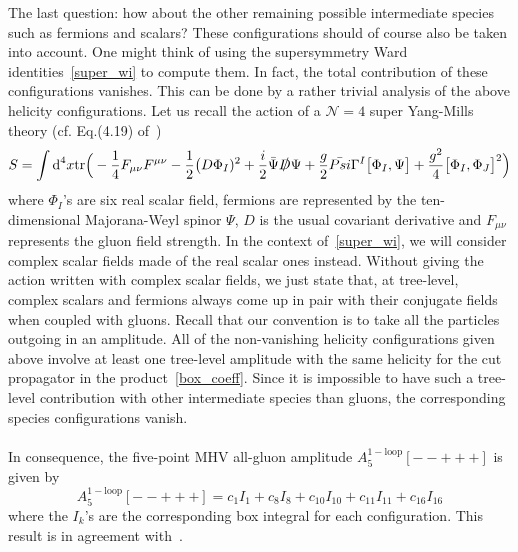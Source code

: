 The last question: how about the other remaining possible intermediate species such as fermions and scalars?
These configurations should of course also be taken into account.
One might think of using the supersymmetry Ward identities~\cref{super_wi} to compute them. 
In fact, the total contribution of these configurations vanishes.
This can be done by a rather trivial analysis of the above helicity configurations.
Let us recall the action of a $\mathcal{N} = 4$ super Yang-Mills theory (cf. \eg Eq.(4.19) of~\cite{Elvang:2013cua})
\begin{equation*}
S = \int \textrm{d}^4 x\mathrm{tr}\Big(
-\frac{1}{4}F_{\mu\nu}F^{\mu\nu} - \frac{1}{2}\big(D\Phi_I)^2 + \frac{i}{2}\bar{\Psi}\slashed{D}\Psi + \frac{g}{2}\bar{Psi}\Gamma^I \big[\Phi_I, \Psi\big] + \frac{g^2}{4}\big[\Phi_I, \Phi_J\big]^2\Big) 
\end{equation*}
where $\Phi_I$'s are six real scalar field, fermions are represented by the ten-dimensional Majorana-Weyl spinor $\Psi$, $D$ is the usual covariant derivative and $F_{\mu\nu}$ represents the gluon field strength.
In the context of~\cref{super_wi}, we will consider complex scalar fields made of the real scalar ones instead. 
Without giving the action written with complex scalar fields, we just state that, at tree-level, complex scalars and fermions always come up in pair with their conjugate fields when coupled with gluons. 
Recall that our convention is to take all the particles outgoing in an amplitude.
All of the non-vanishing helicity configurations given above involve at least one tree-level amplitude with the same helicity for the cut propagator in the product~\cref{box_coeff}.
Since it is impossible to have such a tree-level contribution with other intermediate species than gluons, the corresponding species configurations vanish.
\\\\
In consequence, the five-point MHV all-gluon amplitude $A_5^{\mathrm{1-loop}}[--+++]$ is given by
\begin{equation}
A_5^{\mathrm{1-loop}}[--+++] = c_1 I_{1} + c_8 I_8 + c_{10}I_{10} + c_{11}I_{11} + c_{16}I_{16}
\end{equation}
where the $I_{k}$'s are the corresponding box integral for each configuration.
This result is in agreement with~\cite{Bern:1994zx}.














